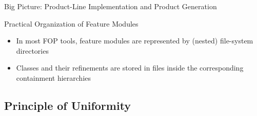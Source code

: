\begin{frame}{Big Picture: Product-Line Implementation and Product Generation}
	\begin{center}
	\end{center}
\end{frame}

\begin{frame}{Practical Organization of Feature Modules}
	\begin{mycolumns}[widths={70,30},animation=none]
		\begin{exampletight}{}
			\centering
		\end{exampletight}
	\mynextcolumn
		\begin{note}{}
			\begin{itemize}
				\item In most FOP tools, feature modules are represented by (nested) file-system directories
				\item Classes and their refinements are stored in files inside the corresponding containment hierarchies
			\end{itemize}
		\end{note}
	\end{mycolumns}
\end{frame}

\subsection{Principle of Uniformity}

